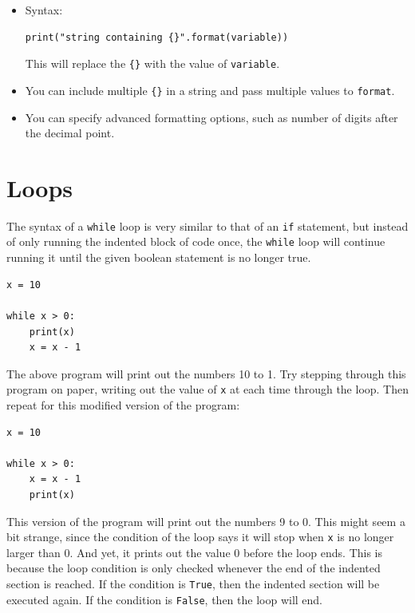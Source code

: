 \documentclass[11pt]{cselabheader}
\begin{document}
\begin{itemize}
  \item Syntax:
    \begin{lstlisting}
print("string containing {}".format(variable))
    \end{lstlisting}
    
    This will replace the \lstinline!{}! with the value of \lstinline{variable}.
    
  \item You can include multiple \lstinline!{}! in a string and pass multiple values to \lstinline{format}.

  \item You can specify advanced formatting options, such as number of digits after the decimal point.
\end{itemize}

\pagebreak
\section{Loops}
The syntax of a \lstinline{while} loop is very similar to that of an
\lstinline{if} statement, but instead of only running the indented block of code
once, the \lstinline{while} loop will continue running it until the given
boolean statement is no longer true.

\begin{lstlisting}[style=python]
x = 10

while x > 0:
    print(x)
    x = x - 1
\end{lstlisting}

The above program will print out the numbers 10 to 1. Try stepping through this
program on paper, writing out the value of \lstinline{x} at each time through
the loop. Then repeat for this modified version of the program:

\begin{lstlisting}[style=python]
x = 10

while x > 0:
    x = x - 1
    print(x)
\end{lstlisting}

This version of the program will print out the numbers 9 to 0. This might seem a
bit strange, since the condition of the loop says it will stop when
\lstinline{x} is no longer larger than 0. And yet, it prints out the value 0
before the loop ends. This is because the loop condition is only checked
whenever the end of the indented section is reached. If the condition is
\lstinline{True}, then the indented section will be executed again. If the
condition is \lstinline{False}, then the loop will end.
\end{document}
